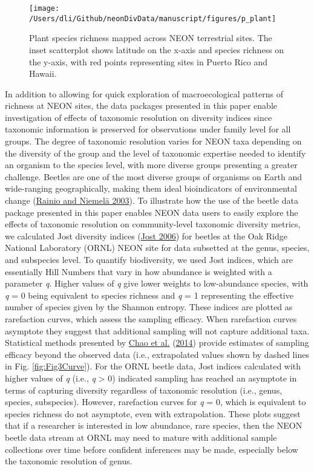 \documentclass[
  12pt,
]{article}
\begin{document}
\begin{figure}

{\centering \texttt{[image: /Users/dli/Github/neonDivData/manuscript/figures/p\_plant]} 

}

\caption{Plant species richness mapped across NEON terrestrial sites. The inset scatterplot shows latitude on the x-axis and species richness on the y-axis, with red points representing sites in Puerto Rico and Hawaii.}\label{fig:Fig2Map}
\end{figure}

In addition to allowing for quick exploration of macroecological patterns of richness at NEON sites, the data packages presented in this paper enable investigation of effects of taxonomic resolution on diversity indices since taxonomic information is preserved for observations under family level for all groups. The degree of taxonomic resolution varies for NEON taxa depending on the diversity of the group and the level of taxonomic expertise needed to identify an organism to the species level, with more diverse groups presenting a greater challenge. Beetles are one of the most diverse groups of organisms on Earth and wide-ranging geographically, making them ideal bioindicators of environmental change (\protect\hyperlink{ref-rainio2003ground}{Rainio and Niemelä 2003}). To illustrate how the use of the beetle data package presented in this paper enables NEON data users to easily explore the effects of taxonomic resolution on community-level taxonomic diversity metrics, we calculated Jost diversity indices (\protect\hyperlink{ref-jost2006entropy}{Jost 2006}) for beetles at the Oak Ridge National Laboratory (ORNL) NEON site for data subsetted at the genus, species, and subspecies level. To quantify biodiversity, we used Jost indices, which are essentially Hill Numbers that vary in how abundance is weighted with a parameter \emph{q}. Higher values of \emph{q} give lower weights to low-abundance species, with \emph{q} = 0 being equivalent to species richness and \emph{q} = 1 representing the effective number of species given by the Shannon entropy. These indices are plotted as rarefaction curves, which assess the sampling efficacy. When rarefaction curves asymptote they suggest that additional sampling will not capture additional taxa. Statistical methods presented by \protect\hyperlink{ref-chao2014rarefaction}{Chao et al.} (\protect\hyperlink{ref-chao2014rarefaction}{2014}) provide estimates of sampling efficacy beyond the observed data (i.e., extrapolated values shown by dashed lines in Fig. \ref{fig:Fig3Curve}). For the ORNL beetle data, Jost indices calculated with higher values of \emph{q} (i.e., \emph{q} \textgreater{} 0) indicated sampling has reached an asymptote in terms of capturing diversity regardless of taxonomic resolution (i.e., genus, species, subspecies). However, rarefaction curves for \emph{q} = 0, which is equivalent to species richness do not asymptote, even with extrapolation. These plots suggest that if a researcher is interested in low abundance, rare species, then the NEON beetle data stream at ORNL may need to mature with additional sample collections over time before confident inferences may be made, especially below the taxonomic resolution of genus.
\end{document}
